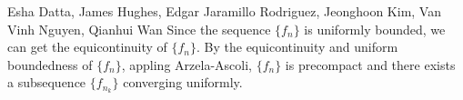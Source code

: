 

\begin{solution}{Esha Datta, James Hughes, Edgar Jaramillo Rodriguez, Jeonghoon Kim, Van Vinh Nguyen, Qianhui Wan}
        Since the sequence $\{f_n\}$ is uniformly bounded, we can get the equicontinuity of $\{f_n\}$.
        By the equicontinuity and uniform boundedness of $\{f_n\}$, appling Arzela-Ascoli, $\{f_n\}$ is precompact and there exists a subsequence $\{f_{n_k}\}$ converging uniformly.
\end{solution}

